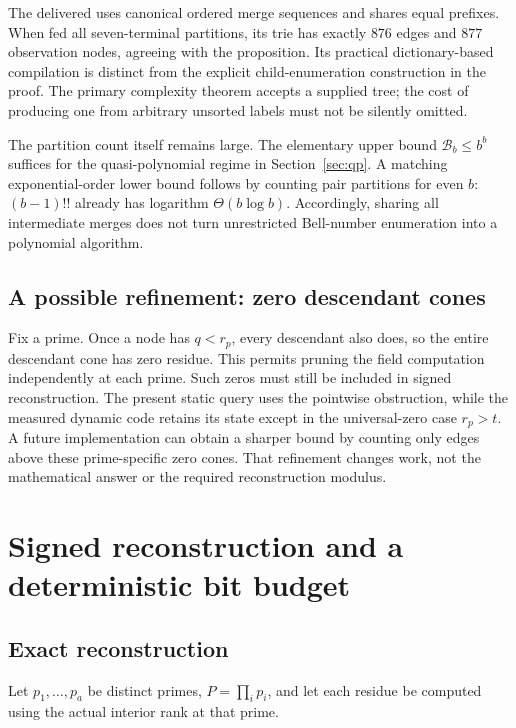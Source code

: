\documentclass[11pt,letterpaper]{article}
\theoremstyle{definition}\newtheorem{definition}[theorem]{Definition}
\theoremstyle{remark}\newtheorem{remark}[theorem]{Remark}
\newcommand{\code}[1]{\texttt{\detokenize{#1}}}
\begin{document}
The delivered \code{MergePlan.compile} uses canonical ordered merge sequences and shares equal prefixes. When fed all seven-terminal partitions, its trie has exactly $876$ edges and $877$ observation nodes, agreeing with the proposition. Its practical dictionary-based compilation is distinct from the explicit child-enumeration construction in the proof. The primary complexity theorem accepts a supplied tree; the cost of producing one from arbitrary unsorted labels must not be silently omitted.

The partition count itself remains large. The elementary upper bound $\mathcal B_b\leq b^b$ suffices for the quasi-polynomial regime in Section~\ref{sec:qp}. A matching exponential-order lower bound follows by counting pair partitions for even $b$: $(b-1)!!$ already has logarithm $\Theta(b\log b)$. Accordingly, sharing all intermediate merges does not turn unrestricted Bell-number enumeration into a polynomial algorithm.

\subsection{A possible refinement: zero descendant cones}
Fix a prime. Once a node has $q<r_p$, every descendant also does, so the entire descendant cone has zero residue. This permits pruning the field computation independently at each prime. Such zeros must still be included in signed reconstruction. The present static query uses the pointwise obstruction, while the measured dynamic code retains its state except in the universal-zero case $r_p>t$. A future implementation can obtain a sharper bound by counting only edges above these prime-specific zero cones. That refinement changes work, not the mathematical answer or the required reconstruction modulus.

\section{Signed reconstruction and a deterministic bit budget}
\label{sec:bit}

\subsection{Exact reconstruction}
Let $p_1,\ldots,p_a$ be distinct primes, $P=\prod_i p_i$, and let each residue be computed using the actual interior rank at that prime.
\end{document}
